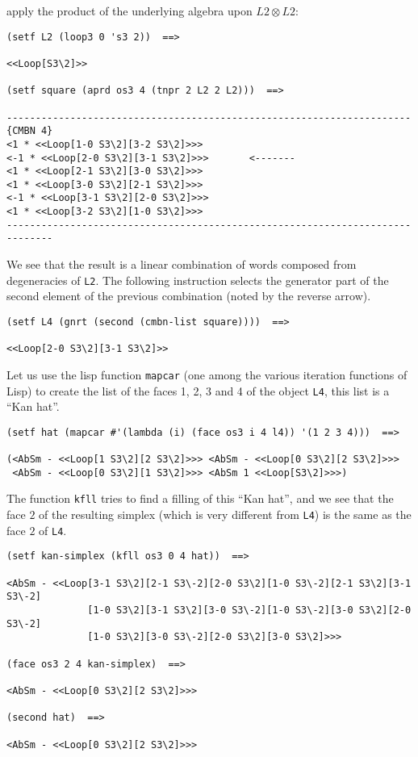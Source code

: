 apply the product of the underlying algebra upon $L2 \otimes L2$:
{\footnotesize\begin{verbatim}
(setf L2 (loop3 0 's3 2))  ==>

<<Loop[S3\2]>>

(setf square (aprd os3 4 (tnpr 2 L2 2 L2)))  ==>

----------------------------------------------------------------------{CMBN 4}
<1 * <<Loop[1-0 S3\2][3-2 S3\2]>>>
<-1 * <<Loop[2-0 S3\2][3-1 S3\2]>>>       <-------
<1 * <<Loop[2-1 S3\2][3-0 S3\2]>>>
<1 * <<Loop[3-0 S3\2][2-1 S3\2]>>>
<-1 * <<Loop[3-1 S3\2][2-0 S3\2]>>>
<1 * <<Loop[3-2 S3\2][1-0 S3\2]>>>
------------------------------------------------------------------------------
\end{verbatim}}
We see that the result is a linear combination of words composed from degeneracies
of {\tt L2}. The following instruction selects the generator part of the
second element of the previous combination (noted by the reverse arrow).
{\footnotesize\begin{verbatim}
(setf L4 (gnrt (second (cmbn-list square))))  ==>

<<Loop[2-0 S3\2][3-1 S3\2]>>
\end{verbatim}}
Let us use the lisp function {\tt mapcar} (one among the various iteration functions of Lisp) to
create the list of the faces 1, 2, 3 and 4 of the object {\tt L4}, this list is a ``Kan hat''.
{\footnotesize\begin{verbatim}
(setf hat (mapcar #'(lambda (i) (face os3 i 4 l4)) '(1 2 3 4)))  ==>

(<AbSm - <<Loop[1 S3\2][2 S3\2]>>> <AbSm - <<Loop[0 S3\2][2 S3\2]>>> 
 <AbSm - <<Loop[0 S3\2][1 S3\2]>>> <AbSm 1 <<Loop[S3\2]>>>)
\end{verbatim}}
The function {\tt kfll} tries to find a filling of this ``Kan hat'', and we see that 
the face $2$ of the resulting simplex (which is very different from {\tt L4}) is  the same 
as the face $2$ of {\tt L4}.
{\footnotesize\begin{verbatim}
(setf kan-simplex (kfll os3 0 4 hat))  ==>

<AbSm - <<Loop[3-1 S3\2][2-1 S3\-2][2-0 S3\2][1-0 S3\-2][2-1 S3\2][3-1 S3\-2]
              [1-0 S3\2][3-1 S3\2][3-0 S3\-2][1-0 S3\-2][3-0 S3\2][2-0 S3\-2]
              [1-0 S3\2][3-0 S3\-2][2-0 S3\2][3-0 S3\2]>>>

(face os3 2 4 kan-simplex)  ==>

<AbSm - <<Loop[0 S3\2][2 S3\2]>>>

(second hat)  ==>

<AbSm - <<Loop[0 S3\2][2 S3\2]>>>
\end{verbatim}}

